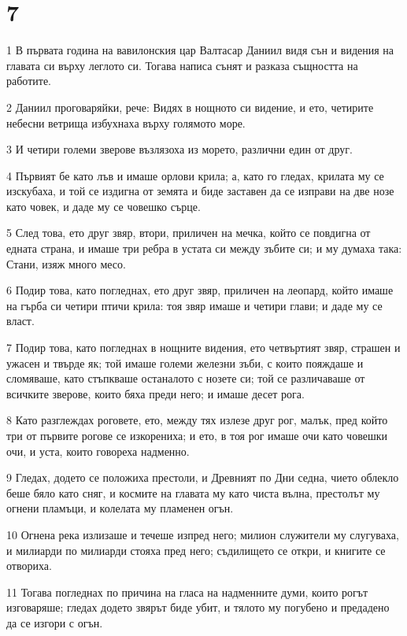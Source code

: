 \chapter{7}

\par 1 В първата година на вавилонския цар Валтасар Даниил видя сън и видения на главата си върху леглото си. Тогава написа сънят и разказа същността на работите.
\par 2 Даниил проговаряйки, рече: Видях в нощното си видение, и ето, четирите небесни ветрища избухнаха върху голямото море.
\par 3 И четири големи зверове възлязоха из морето, различни един от друг.
\par 4 Първият бе като лъв и имаше орлови крила; а, като го гледах, крилата му се изскубаха, и той се издигна от земята и биде заставен да се изправи на две нозе като човек, и даде му се човешко сърце.
\par 5 След това, ето друг звяр, втори, приличен на мечка, който се повдигна от едната страна, и имаше три ребра в устата си между зъбите си; и му думаха така: Стани, изяж много месо.
\par 6 Подир това, като погледнах, ето друг звяр, приличен на леопард, който имаше на гърба си четири птичи крила: тоя звяр имаше и четири глави; и даде му се власт.
\par 7 Подир това, като погледнах в нощните видения, ето четвъртият звяр, страшен и ужасен и твърде як; той имаше големи железни зъби, с които пояждаше и сломяваше, като стъпкваше останалото с нозете си; той се различаваше от всичките зверове, които бяха преди него; и имаше десет рога.
\par 8 Като разглеждах роговете, ето, между тях излезе друг рог, малък, пред който три от първите рогове се изкорениха; и ето, в тоя рог имаше очи като човешки очи, и уста, които говореха надменно.
\par 9 Гледах, додето се положиха престоли, и Древният по Дни седна, чието облекло беше бяло като сняг, и космите на главата му като чиста вълна, престолът му огнени пламъци, и колелата му пламенен огън.
\par 10 Огнена река излизаше и течеше изпред него; милион служители му слугуваха, и  милиарди по милиарди стояха пред него; съдилището се откри, и книгите се отвориха.
\par 11 Тогава погледнах по причина на гласа на надменните думи, които рогът изговаряше; гледах додето звярът биде убит, и тялото му погубено и предадено да се изгори с огън.
